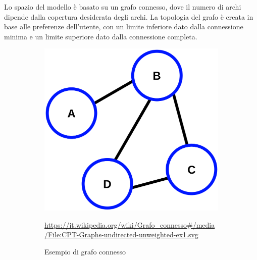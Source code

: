Lo spazio del modello è basato su un grafo connesso, dove il numero 
di archi dipende dalla copertura desiderata degli archi. La topologia 
del grafo è creata in base alle preferenze dell'utente, con un limite 
inferiore dato dalla connessione minima e un limite superiore dato 
dalla connessione completa.

\begin{figure}[!hb]
	\centering
	\begin{subfigure}[b]{0.45\textwidth}
		\centering
		\includegraphics[width=\textwidth]{img/CPT-Graphs-undirected-unweighted-ex1.svg.png}
		\caption{Esempio di grafo connesso}
		\url{https://it.wikipedia.org/wiki/Grafo_connesso#/media/File:CPT-Graphs-undirected-unweighted-ex1.svg}
		\label{fig:connected_graph_example}
	\end{subfigure}
	\hfill
	\begin{subfigure}[b]{0.45\textwidth}
		\centering

\end{subfigure}
\end{figure}
